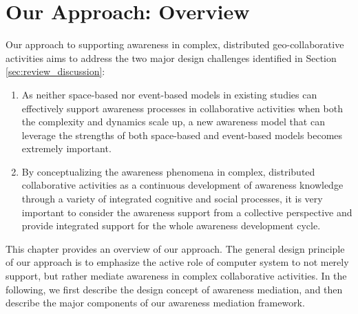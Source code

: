 \graphicspath{{Figures/}}

\chapter{Our Approach: Overview} %
\label{cha:our_approach_overview}

Our approach to supporting awareness in complex, distributed geo-collaborative activities aims to address the two major design challenges identified in Section \ref{sec:review_discussion}: 

\begin{enumerate}
   \item As neither space-based nor event-based models in existing studies can effectively support awareness processes in collaborative activities when both the complexity and dynamics scale up, a new awareness model that can leverage the strengths of both space-based and event-based models becomes extremely important.
   \item By conceptualizing the awareness phenomena in complex, distributed collaborative activities as a continuous development of awareness knowledge through a variety of integrated cognitive and social processes, it is very important to consider the awareness support from a collective perspective and provide integrated support for the whole awareness development cycle.
\end{enumerate}

This chapter provides an overview of our approach. The general design principle of our approach is to emphasize the active role of computer system to not merely support, but rather mediate awareness in complex collaborative activities. In the following, we first describe the design concept of awareness mediation, and then describe the major components of our awareness mediation framework.

